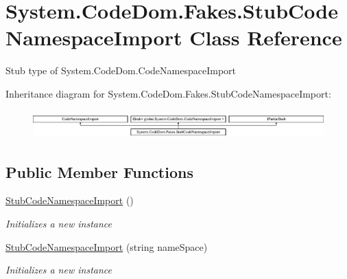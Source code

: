 \hypertarget{class_system_1_1_code_dom_1_1_fakes_1_1_stub_code_namespace_import}{\section{System.\-Code\-Dom.\-Fakes.\-Stub\-Code\-Namespace\-Import Class Reference}
\label{class_system_1_1_code_dom_1_1_fakes_1_1_stub_code_namespace_import}
}


Stub type of System.\-Code\-Dom.\-Code\-Namespace\-Import 


Inheritance diagram for System.\-Code\-Dom.\-Fakes.\-Stub\-Code\-Namespace\-Import\-:\begin{figure}[H]
\begin{center}
\leavevmode
\includegraphics[height=1.088435cm]{class_system_1_1_code_dom_1_1_fakes_1_1_stub_code_namespace_import}
\end{center}
\end{figure}
\subsection*{Public Member Functions}
\begin{DoxyCompactItemize}
\item 
\hyperlink{class_system_1_1_code_dom_1_1_fakes_1_1_stub_code_namespace_import_a3d66a3b3c2b927aa39d72cda679a51ff}{Stub\-Code\-Namespace\-Import} ()
\begin{DoxyCompactList}\small\item\em Initializes a new instance\end{DoxyCompactList}\item 
\hyperlink{class_system_1_1_code_dom_1_1_fakes_1_1_stub_code_namespace_import_a03dc0665a08f6a573993e33cb87adc64}{Stub\-Code\-Namespace\-Import} (string name\-Space)
\begin{DoxyCompactList}\small\item\em Initializes a new instance\end{DoxyCompactList}\end{DoxyCompactItemize}
